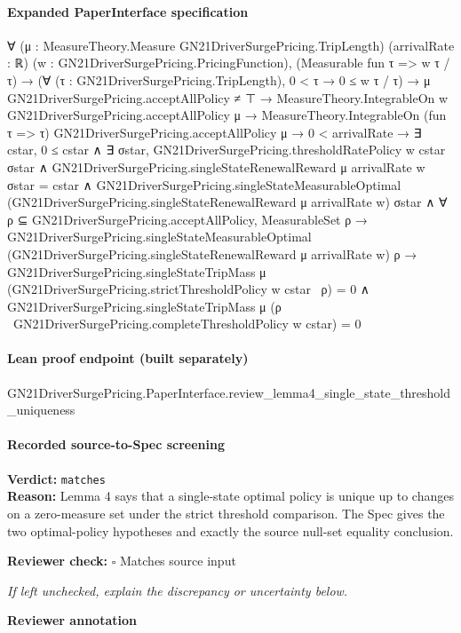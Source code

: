 \documentclass[10pt]{article}
\newcommand{\reviewerbox}{%
  \par\noindent\fbox{\parbox{0.96\linewidth}{\rule{0pt}{0.38in}}}\par
}
\newcommand{\reviewmatch}[1]{%
  \par\noindent\textbf{Reviewer check:} $\square$\; #1\par
  \noindent\emph{If left unchecked, explain the discrepancy or uncertainty below.}\par
}
\begin{document}
\paragraph{Expanded PaperInterface specification}
\begin{ReviewVerbatim}
∀ (μ : MeasureTheory.Measure GN21DriverSurgePricing.TripLength) (arrivalRate : ℝ)
  (w : GN21DriverSurgePricing.PricingFunction),
  (Measurable fun τ => w τ / τ) →
    (∀ (τ : GN21DriverSurgePricing.TripLength), 0 < τ → 0 ≤ w τ / τ) →
      μ GN21DriverSurgePricing.acceptAllPolicy ≠ ⊤ →
        MeasureTheory.IntegrableOn w GN21DriverSurgePricing.acceptAllPolicy μ →
          MeasureTheory.IntegrableOn (fun τ => τ) GN21DriverSurgePricing.acceptAllPolicy μ →
            0 < arrivalRate →
              ∃ cstar,
                0 ≤ cstar ∧
                  ∃ σstar,
                    GN21DriverSurgePricing.thresholdRatePolicy w cstar σstar ∧
                      GN21DriverSurgePricing.singleStateRenewalReward μ arrivalRate w σstar = cstar ∧
                        GN21DriverSurgePricing.singleStateMeasurableOptimal
                            (GN21DriverSurgePricing.singleStateRenewalReward μ arrivalRate w) σstar ∧
                          ∀ ρ ⊆ GN21DriverSurgePricing.acceptAllPolicy,
                            MeasurableSet ρ →
                              GN21DriverSurgePricing.singleStateMeasurableOptimal
                                  (GN21DriverSurgePricing.singleStateRenewalReward μ arrivalRate w) ρ →
                                GN21DriverSurgePricing.singleStateTripMass μ
                                      (GN21DriverSurgePricing.strictThresholdPolicy w cstar \ ρ) =
                                    0 ∧
                                  GN21DriverSurgePricing.singleStateTripMass μ
                                      (ρ \ GN21DriverSurgePricing.completeThresholdPolicy w cstar) =
                                    0
\end{ReviewVerbatim}

\paragraph{Lean proof endpoint (built separately)}\begin{ReviewVerbatim}
GN21DriverSurgePricing.PaperInterface.review_lemma4_single_state_threshold_uniqueness
\end{ReviewVerbatim}

\paragraph{Recorded source-to-Spec screening}
\textbf{Verdict:} \texttt{matches}
\\
\textbf{Reason:} Lemma 4 says that a single-state optimal policy is unique up to changes on a zero-measure set under the strict threshold comparison. The Spec gives the two optimal-policy hypotheses and exactly the source null-set equality conclusion.
\reviewmatch{Matches source input}
\noindent\textbf{Reviewer annotation}\par
\reviewerbox
\clearpage
\hypertarget{source-claim-de2ea96cec45a85c}{}
\end{document}
